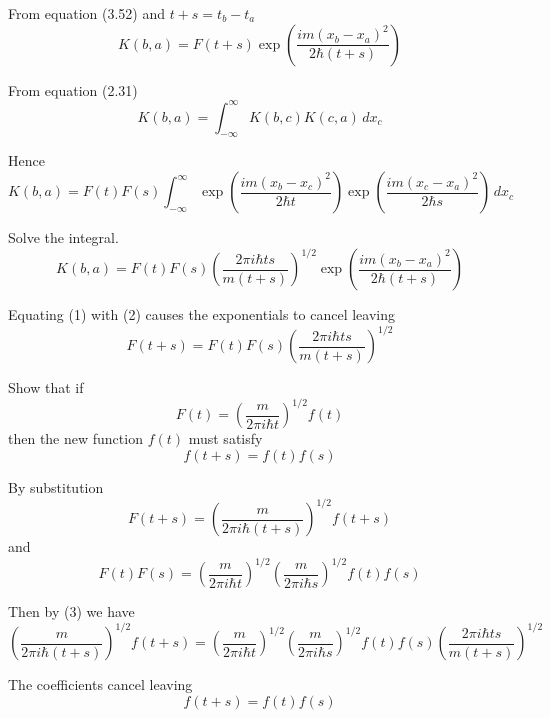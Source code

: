 


From equation (3.52) and $t+s=t_b-t_a$
\begin{equation*}
K(b,a)=F(t+s)\exp\left(\frac{im(x_b-x_a)^2}{2\hbar (t+s)}\right)
\tag{1}
\end{equation*}

From equation (2.31)
\begin{equation*}
K(b,a)=\int_{-\infty}^\infty K(b,c)K(c,a)\,dx_c
\end{equation*}

Hence
\begin{equation*}
K(b,a)=F(t)F(s)\int_{-\infty}^\infty
\exp\left(\frac{im(x_b-x_c)^2}{2\hbar t}\right)
\exp\left(\frac{im(x_c-x_a)^2}{2\hbar s}\right)
\,dx_c
\end{equation*}

Solve the integral.
\begin{equation*}
K(b,a)=F(t)F(s)
\left(\frac{2\pi i\hbar ts}{m(t+s)}\right)^{1/2}
\exp\left(\frac{im(x_b-x_a)^2}{2\hbar(t+s)}\right)
\tag{2}
\end{equation*}

Equating (1) with (2) causes the exponentials to cancel leaving
\begin{equation*}
F(t+s)=F(t)F(s)\left(\frac{2\pi i\hbar ts}{m(t+s)}\right)^{1/2}
\tag{3}
\end{equation*}

Show that if
\begin{equation*}
F(t)=\left(\frac{m}{2\pi i\hbar t}\right)^{1/2} f(t)
\end{equation*}
then the new function $f(t)$ must satisfy
\begin{equation*}
f(t+s)=f(t)f(s)
\end{equation*}

By substitution
\begin{equation*}
F(t+s)=\left(\frac{m}{2\pi i\hbar (t+s)}\right)^{1/2} f(t+s)
\end{equation*}
and
\begin{equation*}
F(t)F(s)=
\left(\frac{m}{2\pi i\hbar t}\right)^{1/2}
\left(\frac{m}{2\pi i\hbar s}\right)^{1/2}
f(t)f(s)
\end{equation*}

Then by (3) we have
\begin{equation*}
\left(\frac{m}{2\pi i\hbar(t+s)}\right)^{1/2}
f(t+s)=
\left(\frac{m}{2\pi i\hbar t}\right)^{1/2}
\left(\frac{m}{2\pi i\hbar s}\right)^{1/2}
f(t)f(s)
\left(\frac{2\pi i\hbar ts}{m(t+s)}\right)^{1/2}
\end{equation*}

The coefficients cancel leaving
\begin{equation*}
f(t+s)=f(t)f(s)
\tag{4}
\end{equation*}


